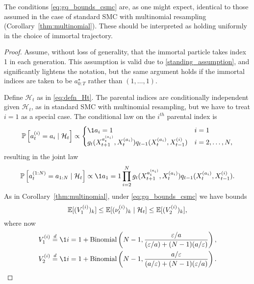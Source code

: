 The conditions \eqref{eq:gq_bounds_csmc} are, as one might expect, identical to those assumed in the case of standard SMC with multinomial resampling (Corollary~\ref{thm:multinomial}).
These should be interpreted as holding uniformly in the choice of immortal trajectory.

\begin{proof}
Assume, without loss of generality, that the immortal particle takes index 1 in each generation. This assumption is valid due to \ref{standing_assumption}, and significantly lightens the notation, but the same argument holds if the immortal indices are taken to be $a_{0:T}^\star$ rather than $(1,\dots,1)$.

Define $\mathcal{H}_t$ as in \eqref{eq:defn_Ht}.
The parental indices are conditionally independent given $\mathcal{H}_t$, as in standard SMC with multinomial resampling, but we have to treat $i=1$ as a special case. The conditional law on the $i^{th}$ parental index is
\begin{equation*}
\Prob \left[ a_t^{(i)} = a_i \mid \mathcal{H}_t \right] \propto
\begin{cases}
\1{a_i=1} &i=1 \\
g_t( X_{t+1}^{a_t^{(a_i)}} , X_t^{(a_i)} ) q_{t-1}(X_t^{(a_i)}, X_{t-1}^{(i)}) &i=2,\dots,N ,
\end{cases}
\end{equation*}
resulting in the joint law
\begin{equation*}
\Prob \left[ a_t^{(1:N)} = a_{1:N} \mid \mathcal{H}_t \right] 
\propto \1{a_1 = 1} \prod_{i=2}^N g_t( X_{t+1}^{a_t^{(a_i)}} , X_t^{(a_i)} )  
        q_{t-1}(X_t^{(a_i)}, X_{t-1}^{(i)}).
\end{equation*}
As in Corollary~\ref{thm:multinomial}, under \eqref{eq:gq_bounds_csmc} we have bounds
\begin{equation*}
\mathbb{E}[ (V_1^{(i)})_k ]
\leq \mathbb{E}[ (\nu_t^{(i)})_k \mid \mathcal{H}_t ]
\leq \mathbb{E}[ (V_2^{(i)})_k ] ,
\end{equation*}
where now
\begin{align*}
& V_1^{(i)} 
    \eqdist \1{i=1} + \operatorname{Binomial}\left(N-1, 
        \frac{\varepsilon/a}{(\varepsilon/a) + (N-1)(a/\varepsilon)} \right) , \\
& V_2^{(i)} 
    \eqdist \1{i=1} + \operatorname{Binomial}\left( N-1, 
        \frac{a/\varepsilon}{(a/\varepsilon) + (N-1)(\varepsilon/a)} \right) .

\end{align*}
\end{proof}
